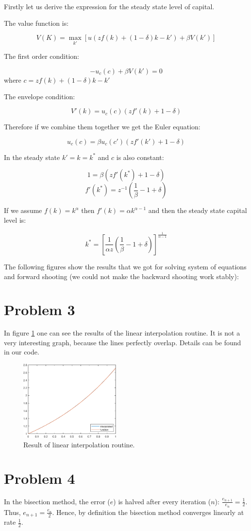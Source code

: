 \documentclass[12pt]{article}
\newcommand{\?}{\stackrel{?}{=}}
\begin{document}
Firstly let us derive the expression for the steady state level of capital.

The value function is:

\[
V(K) = \max_{k'} [ u(zf(k) + (1-\delta)k - k') + \beta V(k')]
\]

The first order condition:

\[
-u_c (c) + \beta V(k') = 0
\]
where $c = zf(k) + (1-\delta)k - k'$

The envelope condition:

\[
V'(k) = u_c (c) (zf'(k) + 1-\delta)
\]

Therefore if we combine them together we get the Euler equation:

\[
u_c (c) = \beta u_c (c') (zf'(k') + 1-\delta) 
\]

In the steady state $k'=k=k^*$ and $c$ is also constant:

\[
1 = \beta (zf'(k^*) + 1 - \delta)
\]
\[
f'(k^*) = z^{-1} \left( \frac{1}{\beta} - 1 + \delta \right)
\]

If we assume $f(k) = k^\alpha$ then $f'(k) = \alpha k^{\alpha-1}$ and then the steady state capital level is:

\[
k^* = \left[ \frac{1}{\alpha z} \left( \frac{1}{\beta} - 1 + \delta \right) \right]^{\frac{1}{\alpha-1}}
\]

The following figures show the results that we got for solving system of equations and forward shooting (we could not make the backward shooting work stably):



\section*{Problem 3}
In figure \ref{fig:lin_int} one can see the results of the linear interpolation routine. It is not a very interesting graph, because the lines perfectly overlap. Details can be found in our code.

\begin{figure}[htbp!]
    \centering
    \includegraphics[width=0.45\textwidth]{PS1/ps3.eps}
    \caption{Result of linear interpolation routine.}
    \label{fig:lin_int}
\end{figure}


\section*{Problem 4}

In the bisection method, the error ($e$) is halved after every iteration ($n$): $\frac{e_{n+1}}{e_n} = \frac{1}{2}$. Thus, $e_{n+1} = \frac{e_n}{2}$. Hence, by definition the bisection method converges linearly at rate $\frac{1}{2}$.
\end{document}
